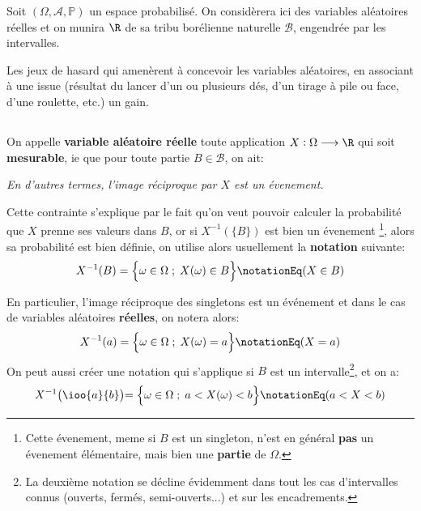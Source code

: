 Soit \((\Omega, \mathscr{A}, \mathbb{P})\) un espace probabilisé. On considèrera ici des variables aléatoires réelles et on munira \(\R\) de sa tribu borélienne naturelle \(\mathscr{B}\), engendrée par les intervalles.\<

Les jeux de hasard qui amenèrent à concevoir les variables aléatoires, en associant à une issue (résultat du lancer d'un ou plusieurs dés, d'un tirage à pile ou face, d'une roulette, etc.) un gain.

\subsection*{}
On appelle \textbf{variable aléatoire réelle} toute application \(X: \Omega \longrightarrow \R\) qui soit \textbf{mesurable}, ie que pour toute partie \(B \in \mathscr{B}\), on ait:
\begin{center}
   \textit{En d'autres termes, l'image réciproque par \(X\) est un évenement.}
\end{center}
Cette contrainte s'explique par le fait qu'on veut pouvoir calculer la probabilité que \(X\) prenne ses valeurs dans \(B\), or si \(X^{-1}(\{B\})\) est bien un évenement \footnote[1]{Cette évenement, meme si \(B\) est un singleton, n'est en général \textbf{pas} un évenement élémentaire, mais bien une \textbf{partie} de \(\Omega\).}, alors sa probabilité est bien définie, on utilise alors usuellement la \textbf{notation} suivante:
\[
   X^{-1}(B) = \Bigl\{ \omega \in \Omega \; ; \;  X(\omega) \in B \Bigl\} \notationEq (X \in B)  
\]

En particulier, l'image réciproque des singletons est un événement et dans le cas de variables aléatoires \textbf{réelles}, on notera alors:
\[
   X^{-1}(a) = \Bigl\{ \omega \in \Omega \; ; \;  X(\omega) = a\Bigl\} \notationEq (X = a) \\
\] 
On peut aussi créer une notation qui s'applique si \(B\) est un intervalle\footnote[2]{La deuxième notation se décline évidemment dans tout les cas d'intervalles connus (ouverts, fermés, semi-ouverts...) et sur les encadrements.}, et on a:
\[
   X^{-1}\bigl(\ioo{a}{b}\bigl) = \Bigl\{ \omega \in \Omega \; ; \;  a < X(\omega) < b\Bigl\} \notationEq (a < X < b)
\]

